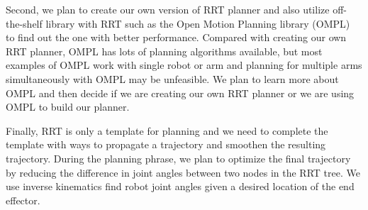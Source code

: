 Second, we plan to create our own version of RRT planner and also utilize off-the-shelf library with RRT such as the Open Motion Planning library (OMPL)~\cite{sucan2012the-open-motion-planning-library} to find out the one with better performance.
Compared with creating our own RRT planner, OMPL has lots of planning algorithms available, but most examples of OMPL work with single robot or arm and planning for multiple arms simultaneously with OMPL may be unfeasible. We plan to learn more about OMPL and then decide if we are creating our own RRT planner or we are using OMPL to build our planner.

Finally, RRT is only a template for planning and we need to complete the template with ways to propagate a trajectory and smoothen the resulting trajectory. 
During the planning phrase, we plan to optimize the final trajectory by reducing the difference in joint angles between two nodes in the RRT tree. We use inverse kinematics find robot joint angles given a desired location of the end effector.









